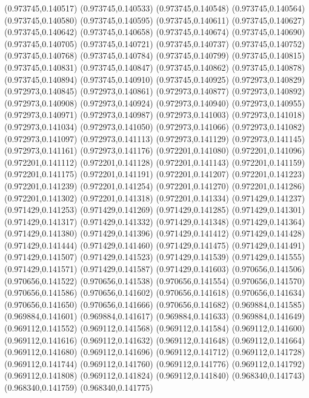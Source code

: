 (0.973745,0.140517)
(0.973745,0.140533)
(0.973745,0.140548)
(0.973745,0.140564)
(0.973745,0.140580)
(0.973745,0.140595)
(0.973745,0.140611)
(0.973745,0.140627)
(0.973745,0.140642)
(0.973745,0.140658)
(0.973745,0.140674)
(0.973745,0.140690)
(0.973745,0.140705)
(0.973745,0.140721)
(0.973745,0.140737)
(0.973745,0.140752)
(0.973745,0.140768)
(0.973745,0.140784)
(0.973745,0.140799)
(0.973745,0.140815)
(0.973745,0.140831)
(0.973745,0.140847)
(0.973745,0.140862)
(0.973745,0.140878)
(0.973745,0.140894)
(0.973745,0.140910)
(0.973745,0.140925)
(0.972973,0.140829)
(0.972973,0.140845)
(0.972973,0.140861)
(0.972973,0.140877)
(0.972973,0.140892)
(0.972973,0.140908)
(0.972973,0.140924)
(0.972973,0.140940)
(0.972973,0.140955)
(0.972973,0.140971)
(0.972973,0.140987)
(0.972973,0.141003)
(0.972973,0.141018)
(0.972973,0.141034)
(0.972973,0.141050)
(0.972973,0.141066)
(0.972973,0.141082)
(0.972973,0.141097)
(0.972973,0.141113)
(0.972973,0.141129)
(0.972973,0.141145)
(0.972973,0.141161)
(0.972973,0.141176)
(0.972201,0.141080)
(0.972201,0.141096)
(0.972201,0.141112)
(0.972201,0.141128)
(0.972201,0.141143)
(0.972201,0.141159)
(0.972201,0.141175)
(0.972201,0.141191)
(0.972201,0.141207)
(0.972201,0.141223)
(0.972201,0.141239)
(0.972201,0.141254)
(0.972201,0.141270)
(0.972201,0.141286)
(0.972201,0.141302)
(0.972201,0.141318)
(0.972201,0.141334)
(0.971429,0.141237)
(0.971429,0.141253)
(0.971429,0.141269)
(0.971429,0.141285)
(0.971429,0.141301)
(0.971429,0.141317)
(0.971429,0.141332)
(0.971429,0.141348)
(0.971429,0.141364)
(0.971429,0.141380)
(0.971429,0.141396)
(0.971429,0.141412)
(0.971429,0.141428)
(0.971429,0.141444)
(0.971429,0.141460)
(0.971429,0.141475)
(0.971429,0.141491)
(0.971429,0.141507)
(0.971429,0.141523)
(0.971429,0.141539)
(0.971429,0.141555)
(0.971429,0.141571)
(0.971429,0.141587)
(0.971429,0.141603)
(0.970656,0.141506)
(0.970656,0.141522)
(0.970656,0.141538)
(0.970656,0.141554)
(0.970656,0.141570)
(0.970656,0.141586)
(0.970656,0.141602)
(0.970656,0.141618)
(0.970656,0.141634)
(0.970656,0.141650)
(0.970656,0.141666)
(0.970656,0.141682)
(0.969884,0.141585)
(0.969884,0.141601)
(0.969884,0.141617)
(0.969884,0.141633)
(0.969884,0.141649)
(0.969112,0.141552)
(0.969112,0.141568)
(0.969112,0.141584)
(0.969112,0.141600)
(0.969112,0.141616)
(0.969112,0.141632)
(0.969112,0.141648)
(0.969112,0.141664)
(0.969112,0.141680)
(0.969112,0.141696)
(0.969112,0.141712)
(0.969112,0.141728)
(0.969112,0.141744)
(0.969112,0.141760)
(0.969112,0.141776)
(0.969112,0.141792)
(0.969112,0.141808)
(0.969112,0.141824)
(0.969112,0.141840)
(0.968340,0.141743)
(0.968340,0.141759)
(0.968340,0.141775)

